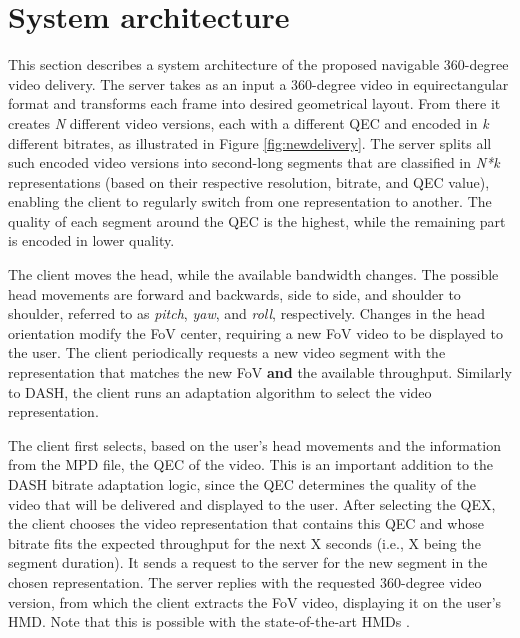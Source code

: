 \section{System architecture}

This section describes a system architecture of the proposed navigable 360-degree video delivery. %
The server takes as an input a 360-degree video in equirectangular format and transforms each frame into desired geometrical layout. From there it creates \textit{N} different video versions, each with a different QEC and encoded in \textit{k} different bitrates, as illustrated in Figure \ref{fig:newdelivery}. The server splits all such encoded video versions into second-long segments that are classified in \textit{N*k} representations (based on their respective resolution, bitrate, and QEC value), enabling the client to regularly switch from one representation to another. The quality of each segment around the QEC is the highest, while the remaining part is encoded in lower quality.



The client moves the head, while the available bandwidth changes. The possible head movements are forward and backwards, side to side, and shoulder to shoulder, referred to as \emph{pitch}, \emph{yaw}, and \emph{roll}, respectively. Changes in the head orientation modify the FoV center, requiring a new FoV video to be displayed to the user. The client periodically requests a new video segment with the representation that matches the new FoV \textbf{and} the available throughput. Similarly to DASH, the client runs an adaptation algorithm to select the video representation.

 The client first selects, based on the user's head movements and the information from the MPD file, the QEC of the video. This is an important addition to the DASH bitrate adaptation logic, since the QEC determines the quality of the video that will be delivered and displayed to the user. After selecting the QEX, the client chooses the video representation that contains this QEC and whose bitrate fits the expected throughput for the next X seconds (i.e., X being the segment duration). It sends a request to the server for the new segment in the chosen representation. The server replies with the requested 360-degree video version, from which the client extracts the FoV video, displaying it on the user's HMD. Note that this is possible with the state-of-the-art HMDs \cite{}. %

